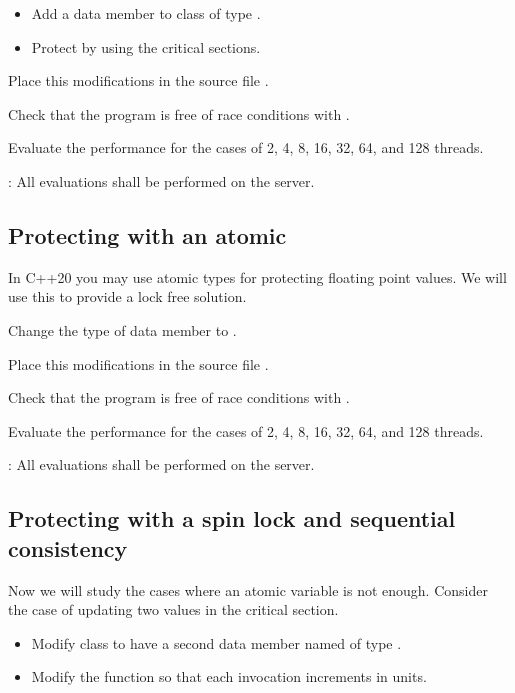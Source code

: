 \begin{itemize}
  \item Add a data member to class  of type .
  \item Protect by using  the critical sections.
\end{itemize}

Place this modifications in the source file .

Check that the program is free of race conditions with .

Evaluate the performance for the cases of 2, 4, 8, 16, 32, 64, and 128 threads.

: All evaluations shall be performed on the  server.

\subsection{Protecting with an atomic}

In C++20 you may use atomic types for protecting floating point values.
We will use this to provide a lock free solution.

Change the type of data member  to .

Place this modifications in the source file .

Check that the program is free of race conditions with .

Evaluate the performance for the cases of 2, 4, 8, 16, 32, 64, and 128 threads.

: All evaluations shall be performed on the  server.

\subsection{Protecting with a spin lock and sequential consistency}

Now we will study the cases where an atomic variable is not enough.
Consider the case of updating two values in the critical section.

\begin{itemize}

  \item Modify class  to have a second data member named  
        of type .

  \item Modify the  function so that each invocation increments
         in  units.

\end{itemize}

